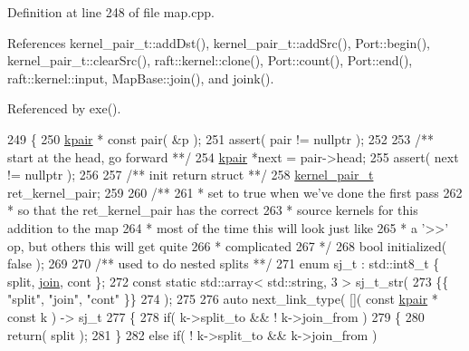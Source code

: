 Definition at line 248 of file map.\+cpp.



References kernel\+\_\+pair\+\_\+t\+::add\+Dst(), kernel\+\_\+pair\+\_\+t\+::add\+Src(), Port\+::begin(), kernel\+\_\+pair\+\_\+t\+::clear\+Src(), raft\+::kernel\+::clone(), Port\+::count(), Port\+::end(), raft\+::kernel\+::input, Map\+Base\+::join(), and joink().



Referenced by exe().


\begin{DoxyCode}
249 \{
250     \hyperlink{classkpair}{kpair} * \textcolor{keyword}{const} pair( &p );
251     assert( pair != \textcolor{keyword}{nullptr} );
252     \textcolor{comment}{}
253 \textcolor{comment}{    /** start at the head, go forward **/}
254     \hyperlink{classkpair}{kpair} *next = pair->head;
255     assert( next != \textcolor{keyword}{nullptr} );
256     \textcolor{comment}{}
257 \textcolor{comment}{    /** init return struct **/}
258     \hyperlink{classkernel__pair__t}{kernel\_pair\_t} ret\_kernel\_pair;
259     \textcolor{comment}{}
260 \textcolor{comment}{    /** }
261 \textcolor{comment}{     * set to true when we've done the first pass}
262 \textcolor{comment}{     * so that the ret\_kernel\_pair has the correct}
263 \textcolor{comment}{     * source kernels for this addition to the map}
264 \textcolor{comment}{     * most of the time this will look just like}
265 \textcolor{comment}{     * a '>>' op, but others this will get quite}
266 \textcolor{comment}{     * complicated}
267 \textcolor{comment}{     */}
268     \textcolor{keywordtype}{bool} initialized( \textcolor{keyword}{false} );
269     \textcolor{comment}{}
270 \textcolor{comment}{    /** used to do nested splits **/}
271     \textcolor{keyword}{enum} sj\_t : std::int8\_t \{ split, \hyperlink{class_map_base_a2624d7b81f0078dcc78e524045403e28}{join}, cont \};
272     \textcolor{keyword}{const} \textcolor{keyword}{static} std::array< std::string, 3 > sj\_t\_str( 
273         \{\{ \textcolor{stringliteral}{"split"}, \textcolor{stringliteral}{"join"}, \textcolor{stringliteral}{"cont"} \}\} 
274     );
275 
276     \textcolor{keyword}{auto} next\_link\_type( []( \textcolor{keyword}{const} \hyperlink{classkpair}{kpair} * \textcolor{keyword}{const} k ) -> sj\_t
277     \{
278         \textcolor{keywordflow}{if}( k->split\_to && ! k->join\_from )
279         \{
280             return( split );
281         \}
282         \textcolor{keywordflow}{else} \textcolor{keywordflow}{if}( ! k->split\_to && k->join\_from )

\end{DoxyCode}
